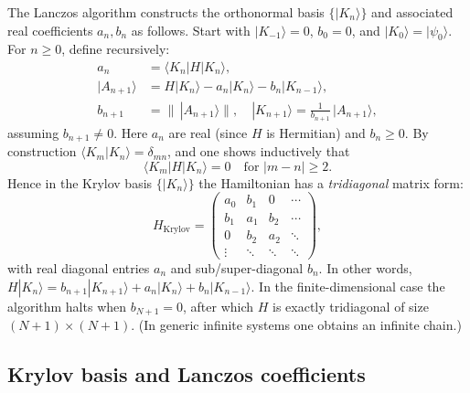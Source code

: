 \documentclass[11pt]{article}
\begin{document}
The Lanczos algorithm constructs the orthonormal basis $\{|K_n\rangle\}$ and associated real coefficients $a_n,b_n$ as follows.  Start with $|K_{-1}\rangle=0$, $b_0=0$, and $|K_0\rangle=|\psi_0\rangle$.  For $n\ge0$, define recursively:
\begin{align*}
a_n &= \langle K_n|H|K_n\rangle,\\
|A_{n+1}\rangle &= H|K_n\rangle - a_n |K_n\rangle - b_n |K_{n-1}\rangle,\\
b_{n+1} &= \|\,|A_{n+1}\rangle\|,\quad
|K_{n+1}\rangle = \frac{1}{b_{n+1}}\,|A_{n+1}\rangle,
\end{align*}
assuming $b_{n+1}\neq0$.  Here $a_n$ are real (since $H$ is Hermitian) and $b_n\ge0$.  By construction $\langle K_m|K_n\rangle=\delta_{mn}$, and one shows inductively that 
\begin{equation*}
\langle K_m|H|K_n\rangle = 0 
\quad\text{for }|m-n|\ge2.
\end{equation*}
Hence in the Krylov basis $\{|K_n\rangle\}$ the Hamiltonian has a \emph{tridiagonal} matrix form:
\begin{equation*}
H_{\text{Krylov}} = 
\begin{pmatrix}
a_0 & b_1 & 0   & \cdots\\
b_1 & a_1 & b_2 & \cdots\\
0   & b_2 & a_2 & \ddots\\
\vdots & \ddots & \ddots & \ddots
\end{pmatrix},
\end{equation*}
with real diagonal entries $a_n$ and sub/super-diagonal $b_n$.  In other words, $H|K_n\rangle = b_{n+1}|K_{n+1}\rangle + a_n |K_n\rangle + b_n |K_{n-1}\rangle$.  In the finite-dimensional case the algorithm halts when $b_{N+1}=0$, after which $H$ is exactly tridiagonal of size $(N+1)\times(N+1)$.  (In generic infinite systems one obtains an infinite chain.)

\subsection{Krylov basis and Lanczos coefficients}
\end{document}
